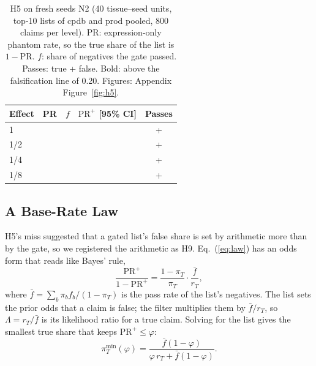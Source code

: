 \documentclass[letterpaper]{article} %
\begin{document}
\begin{table}[t]
\centering
\small
\setlength{\tabcolsep}{3.5pt}
\begin{tabular}{@{}lcccc@{}}
\toprule
Effect & PR & $f$ & $\mathrm{PR}^{+}$ [95\% CI] & Passes \\
\midrule
1   & \hfiveDefaultOnePR{} & \baseOneNegPassRate{} & \hfiveDefaultOnePRafter{} {\footnotesize\hfiveDefaultOnePRafterci{}}
    & \baseOneTruePassed{}+\baseOneNegPassed{} \\
1/2 & \hfiveDefaultHalfPR{} & \baseHalfNegPassRate{} & \hfiveDefaultHalfPRafter{}
      {\footnotesize\hfiveDefaultHalfPRafterci{}} & \baseHalfTruePassed{}+\baseHalfNegPassed{} \\
1/4 & \hfiveDefaultQuarterPR{} & \baseQuarterNegPassRate{} & \hfiveDefaultQuarterPRafter{}
      {\footnotesize\hfiveDefaultQuarterPRafterci{}} & \baseQuarterTruePassed{}+\baseQuarterNegPassed{} \\
1/8 & \hfiveDefaultEighthPR{} & \baseEighthNegPassRate{} & \textbf{\hfiveDefaultEighthPRafter{}}
      {\footnotesize\hfiveDefaultEighthPRafterci{}} & \baseEighthTruePassed{}+\baseEighthNegPassed{} \\
\bottomrule
\end{tabular}
\caption{H5 on fresh seeds N2 (40 tissue--seed units, top-10 lists of cpdb and prod pooled, 800 claims per level).
PR: expression-only phantom rate, so the true share of the list is $1-\mathrm{PR}$. $f$: share of negatives the gate
passed. Passes: true + false. Bold: above the falsification line of 0.20. Figures: Appendix Figure~\ref{fig:h5}.}
\label{tab:h5}
\end{table}

\subsection{A Base-Rate Law}
H5's miss suggested that a gated list's false share is set by arithmetic more than by the gate, so we registered the
arithmetic as H9. Eq.~(\ref{eq:law}) has an odds form that reads like Bayes' rule,
\begin{equation}
\frac{\mathrm{PR}^{+}}{1-\mathrm{PR}^{+}}=\frac{1-\pi_T}{\pi_T}\cdot\frac{\bar f}{r_T},
\label{eq:odds}
\end{equation}
where $\bar f=\sum_b\pi_b f_b/(1-\pi_T)$ is the pass rate of the list's negatives. The list sets the prior odds that a
claim is false; the filter multiplies them by $\bar f/r_T$, so $\Lambda=r_T/\bar f$ is its likelihood ratio for a true
claim. Solving for the list gives the smallest true share that keeps $\mathrm{PR}^{+}\leq\varphi$:
\begin{equation}
\pi_T^{\min}(\varphi)=\frac{\bar f(1-\varphi)}{\varphi\,r_T+\bar f(1-\varphi)}.
\label{eq:pimin}
\end{equation}
\end{document}
